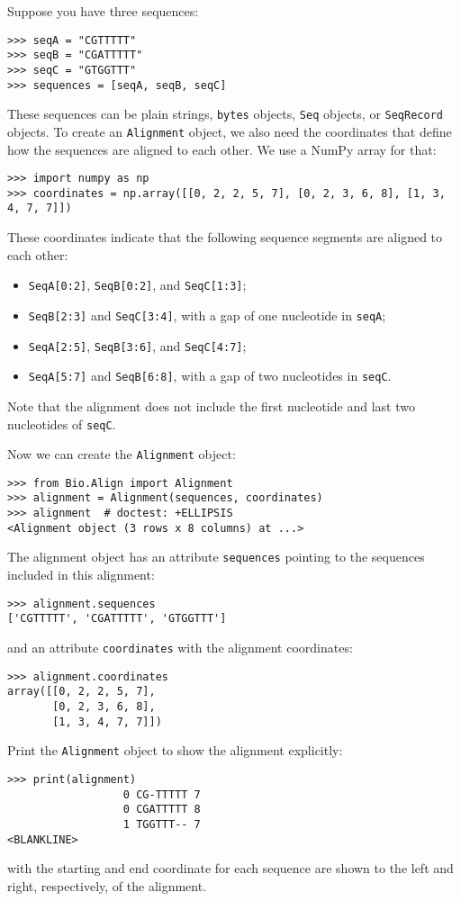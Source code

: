 Suppose you have three sequences:
\begin{verbatim}
>>> seqA = "CGTTTTT"
>>> seqB = "CGATTTTT"
>>> seqC = "GTGGTTT"
>>> sequences = [seqA, seqB, seqC]
\end{verbatim}
These sequences can be plain strings, \verb|bytes| objects, \verb|Seq| objects,  or \verb|SeqRecord| objects. To create an \verb|Alignment| object, we also need the coordinates that define how the sequences are aligned to each other. We use a NumPy array for that:
\begin{verbatim}
>>> import numpy as np
>>> coordinates = np.array([[0, 2, 2, 5, 7], [0, 2, 3, 6, 8], [1, 3, 4, 7, 7]])
\end{verbatim}
These coordinates indicate that the following sequence segments are aligned to each other:
\begin{itemize}
\item \verb|SeqA[0:2]|, \verb|SeqB[0:2]|, and \verb|SeqC[1:3]|;
\item \verb|SeqB[2:3]| and \verb|SeqC[3:4]|, with a gap of one nucleotide in \verb|seqA|;
\item \verb|SeqA[2:5]|, \verb|SeqB[3:6]|, and \verb|SeqC[4:7]|;
\item \verb|SeqA[5:7]| and \verb|SeqB[6:8]|, with a gap of two nucleotides in \verb|seqC|.
\end{itemize}
Note that the alignment does not include the first nucleotide and last two nucleotides of \verb|seqC|.

Now we can create the \verb|Alignment| object:
\begin{verbatim}
>>> from Bio.Align import Alignment
>>> alignment = Alignment(sequences, coordinates)
>>> alignment  # doctest: +ELLIPSIS
<Alignment object (3 rows x 8 columns) at ...>
\end{verbatim}
The alignment object has an attribute \verb|sequences| pointing to the sequences included in this alignment:
\begin{verbatim}
>>> alignment.sequences
['CGTTTTT', 'CGATTTTT', 'GTGGTTT']
\end{verbatim}
and an attribute \verb|coordinates| with the alignment coordinates:
\begin{verbatim}
>>> alignment.coordinates
array([[0, 2, 2, 5, 7],
       [0, 2, 3, 6, 8],
       [1, 3, 4, 7, 7]])
\end{verbatim}
Print the \verb+Alignment+ object to show the alignment explicitly:
\begin{verbatim}
>>> print(alignment)
                  0 CG-TTTTT 7
                  0 CGATTTTT 8
                  1 TGGTTT-- 7
<BLANKLINE>
\end{verbatim}
with the starting and end coordinate for each sequence are shown to the left and right, respectively, of the alignment.

